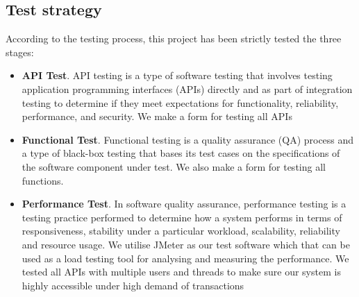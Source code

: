 \documentclass[runningheads]{llncs}
\begin{document}
\subsection{Test strategy}
According to the testing process, this project has been strictly tested the three stages: 
\begin{itemize}
	\item \textbf{API Test}. API testing is a type of software testing that involves testing application programming interfaces (APIs) directly and as part of integration testing to determine if they meet expectations for functionality, reliability, performance, and security. We make a form for testing all APIs
	\item \textbf{Functional Test}. Functional testing is a quality assurance (QA) process\cite{wu2009qualityassurance} and a type of black-box testing that bases its test cases on the specifications of the software component under test. We also make a form for testing all functions.
	\item \textbf{Performance Test}. In software quality assurance, performance testing is a testing practice performed to determine how a system performs in terms of responsiveness, stability under a particular workload, scalability, reliability and resource usage. We utilise JMeter\cite{halili2008jemeter} as our test software which that can be used as a load testing tool for analysing and measuring the performance. We tested all APIs with multiple users and threads to make sure our system is highly accessible under high demand of transactions 
\end{itemize}
\end{document}

